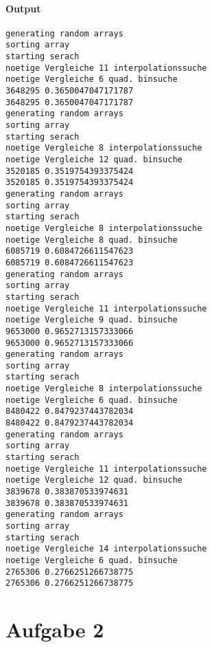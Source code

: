 \paragraph{Output}
\begin{verbatim}
generating random arrays
sorting array
starting serach
noetige Vergleiche 11 interpolationssuche
noetige Vergleiche 6 quad. binsuche
3648295 0.3650047047171787
3648295 0.3650047047171787
generating random arrays
sorting array
starting serach
noetige Vergleiche 8 interpolationssuche
noetige Vergleiche 12 quad. binsuche
3520185 0.3519754393375424
3520185 0.3519754393375424
generating random arrays
sorting array
starting serach
noetige Vergleiche 8 interpolationssuche
noetige Vergleiche 8 quad. binsuche
6085719 0.6084726611547623
6085719 0.6084726611547623
generating random arrays
sorting array
starting serach
noetige Vergleiche 11 interpolationssuche
noetige Vergleiche 9 quad. binsuche
9653000 0.9652713157333066
9653000 0.9652713157333066
generating random arrays
sorting array
starting serach
noetige Vergleiche 8 interpolationssuche
noetige Vergleiche 6 quad. binsuche
8480422 0.8479237443782034
8480422 0.8479237443782034
generating random arrays
sorting array
starting serach
noetige Vergleiche 11 interpolationssuche
noetige Vergleiche 12 quad. binsuche
3839678 0.383870533974631
3839678 0.383870533974631
generating random arrays
sorting array
starting serach
noetige Vergleiche 14 interpolationssuche
noetige Vergleiche 6 quad. binsuche
2765306 0.2766251266738775
2765306 0.2766251266738775
\end{verbatim}

\section*{Aufgabe 2}

